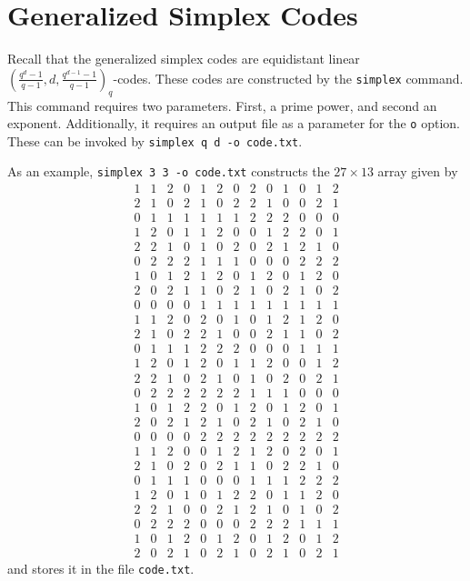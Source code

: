 \documentclass[a4paper,10pt]{article}
\begin{document}
\section{\centering\sc Generalized Simplex Codes}

Recall that the generalized simplex codes are equidistant linear $\left( \frac{q^d-1}{q-1},d,\frac{q^{d-1}-1}{q-1} \right)_q$-codes. These codes are constructed by the {\tt simplex} command. This command requires two parameters. First, a prime power, and second an exponent. Additionally, it requires an output file as a parameter for the {\tt o} option. These can be invoked by {\tt simplex q d -o code.txt}.

As an example, {\tt simplex 3 3 -o code.txt} constructs the $27 \times 13$ array given by
\[
 \begin{array}{rrrrrrrrrrrrr}
1 & 1 & 2 & 0 & 1 & 2 & 0 & 2 & 0 & 1 & 0 & 1 & 2 \\
2 & 1 & 0 & 2 & 1 & 0 & 2 & 2 & 1 & 0 & 0 & 2 & 1 \\
0 & 1 & 1 & 1 & 1 & 1 & 1 & 2 & 2 & 2 & 0 & 0 & 0 \\
1 & 2 & 0 & 1 & 1 & 2 & 0 & 0 & 1 & 2 & 2 & 0 & 1 \\
2 & 2 & 1 & 0 & 1 & 0 & 2 & 0 & 2 & 1 & 2 & 1 & 0 \\
0 & 2 & 2 & 2 & 1 & 1 & 1 & 0 & 0 & 0 & 2 & 2 & 2 \\
1 & 0 & 1 & 2 & 1 & 2 & 0 & 1 & 2 & 0 & 1 & 2 & 0 \\
2 & 0 & 2 & 1 & 1 & 0 & 2 & 1 & 0 & 2 & 1 & 0 & 2 \\
0 & 0 & 0 & 0 & 1 & 1 & 1 & 1 & 1 & 1 & 1 & 1 & 1 \\
1 & 1 & 2 & 0 & 2 & 0 & 1 & 0 & 1 & 2 & 1 & 2 & 0 \\
2 & 1 & 0 & 2 & 2 & 1 & 0 & 0 & 2 & 1 & 1 & 0 & 2 \\
0 & 1 & 1 & 1 & 2 & 2 & 2 & 0 & 0 & 0 & 1 & 1 & 1 \\
1 & 2 & 0 & 1 & 2 & 0 & 1 & 1 & 2 & 0 & 0 & 1 & 2 \\
2 & 2 & 1 & 0 & 2 & 1 & 0 & 1 & 0 & 2 & 0 & 2 & 1 \\
0 & 2 & 2 & 2 & 2 & 2 & 2 & 1 & 1 & 1 & 0 & 0 & 0 \\
1 & 0 & 1 & 2 & 2 & 0 & 1 & 2 & 0 & 1 & 2 & 0 & 1 \\
2 & 0 & 2 & 1 & 2 & 1 & 0 & 2 & 1 & 0 & 2 & 1 & 0 \\
0 & 0 & 0 & 0 & 2 & 2 & 2 & 2 & 2 & 2 & 2 & 2 & 2 \\
1 & 1 & 2 & 0 & 0 & 1 & 2 & 1 & 2 & 0 & 2 & 0 & 1 \\
2 & 1 & 0 & 2 & 0 & 2 & 1 & 1 & 0 & 2 & 2 & 1 & 0 \\
0 & 1 & 1 & 1 & 0 & 0 & 0 & 1 & 1 & 1 & 2 & 2 & 2 \\
1 & 2 & 0 & 1 & 0 & 1 & 2 & 2 & 0 & 1 & 1 & 2 & 0 \\
2 & 2 & 1 & 0 & 0 & 2 & 1 & 2 & 1 & 0 & 1 & 0 & 2 \\
0 & 2 & 2 & 2 & 0 & 0 & 0 & 2 & 2 & 2 & 1 & 1 & 1 \\
1 & 0 & 1 & 2 & 0 & 1 & 2 & 0 & 1 & 2 & 0 & 1 & 2 \\
2 & 0 & 2 & 1 & 0 & 2 & 1 & 0 & 2 & 1 & 0 & 2 & 1
\end{array}
\]
and stores it in the file {\tt code.txt}.
\end{document}
